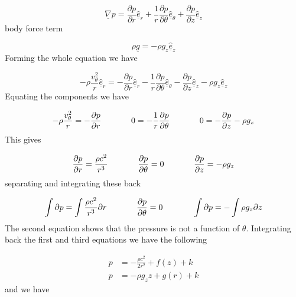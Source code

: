 \begin{equation*}
  \underline{\nabla}p=\frac{\partial{}p}{\partial{}r}\hat{\underline{e}}_{r}+\frac{1}{r}\frac{\partial{}p}{\partial\theta}\hat{\underline{e}}_{\theta}+\frac{\partial{}p}{\partial{}z}\hat{\underline{e}}_{z}
\end{equation*}
body force term

\begin{equation*}
  \rho\underline{g}=-\rho{}g_{z}\hat{\underline{e}}_{z}
\end{equation*}
Forming the whole equation we have

\begin{equation*}
  -\rho\frac{v_{\theta}^{2}}{r}\hat{\underline{e}}_{r}=-\frac{\partial{}p}{\partial{}r}\hat{\underline{e}}_{r}-\frac{1}{r}\frac{\partial{}p}{\partial\theta}\hat{\underline{e}}_{\theta}-\frac{\partial{}p}{\partial{}z}\hat{\underline{e}}_{z}-\rho{}g_{z}\hat{\underline{e}}_{z}
\end{equation*}
Equating the components we have

\begin{equation*}
  -\rho\frac{v_{\theta}^{2}}{r}=-\frac{\partial{}p}{\partial{}r}
  \hspace{0.5in}
  0=-\frac{1}{r}\frac{\partial{}p}{\partial\theta}
  \hspace{0.5in}
  0=-\frac{\partial{}p}{\partial{}z}-\rho{}g_{z}
\end{equation*}
This gives

\begin{equation*}
  \frac{\partial{}p}{\partial{}r}=\frac{\rho{}c^{2}}{r^{3}}
  \hspace{0.5in}
  \frac{\partial{}p}{\partial\theta}=0
  \hspace{0.5in}
  \frac{\partial{}p}{\partial{}z}=-\rho{}g_{z}
\end{equation*}
separating and integrating these back

\begin{equation*}
  \int\partial{}p=\int\frac{\rho{}c^{2}}{r^{3}}\partial{}r
  \hspace{0.5in}
  \frac{\partial{}p}{\partial\theta}=0
  \hspace{0.5in}
  \int\partial{}p=-\int\rho{}g_{z}\partial{}z
\end{equation*}
The second equation shows that the pressure is not a function of $\theta$.
Integrating back the first and third equations we have the following

\begin{equation*}
  \begin{split}
    p&=-\frac{\rho{}c^{2}}{2r^{2}}+f(z)+k \\
    p&=-\rho{}g_{z}z+g(r)+k
  \end{split}
\end{equation*}
and we have

